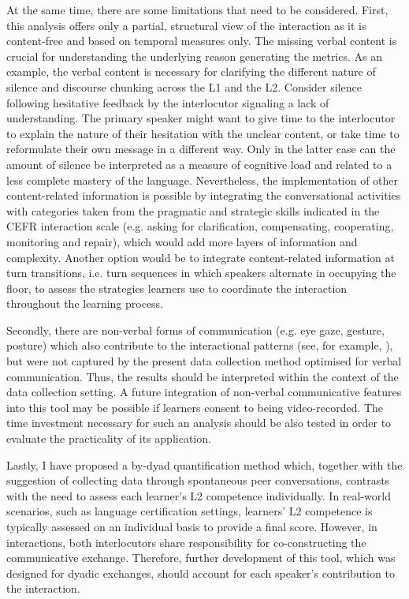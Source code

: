 At the same time, there are some limitations that need to be considered. First, this analysis offers only a partial, structural view of the interaction as it is content-free and based on temporal measures only. The missing verbal content is crucial for understanding the underlying reason generating the metrics. As an example, the verbal content is necessary for clarifying the different nature of silence and discourse chunking across the L1 and the L2. Consider silence following hesitative feedback by the interlocutor signaling a lack of understanding. The primary speaker might want to give time to the interlocutor to explain the nature of their hesitation with the unclear content, or take time to reformulate their own message in a different way. Only in the latter case can the amount of silence be interpreted as a measure of cognitive load and related to a less complete mastery of the language. Nevertheless, the implementation of other content-related information is possible by integrating the conversational activities with categories taken from the pragmatic and strategic skills indicated in the CEFR interaction scale (e.g. asking for clarification, compensating, cooperating, monitoring and repair), which would add more layers of information and complexity. Another option would be to integrate content-related information at turn transitions, i.e. turn sequences in which speakers alternate in occupying the floor, to assess the strategies learners use to coordinate the interaction throughout the learning process.

Secondly, there are non-verbal forms of communication (e.g. eye gaze, gesture, posture) which also contribute to the interactional patterns (see, for example,  \citealt{Kosmala2024}), but were not captured by the present data collection method optimised for verbal communication. Thus, the results should be interpreted within the context of the data collection setting. A future integration of non-verbal communicative features into this tool may be possible if learners consent to being video-recorded. The time investment necessary for such an analysis should be also tested in order to evaluate the practicality of its application.

Lastly, I have proposed a by-dyad quantification method which, together with the suggestion of collecting data through spontaneous peer conversations, contrasts with the need to assess each learner’s L2 competence individually. In real-world scenarios, such as language certification settings, learners’ L2 competence is typically assessed on an individual basis to provide a final score. However, in interactions, both interlocutors share responsibility for co-constructing the communicative exchange. Therefore, further development of this tool, which was designed for dyadic exchanges, should account for each speaker’s contribution to the interaction.


